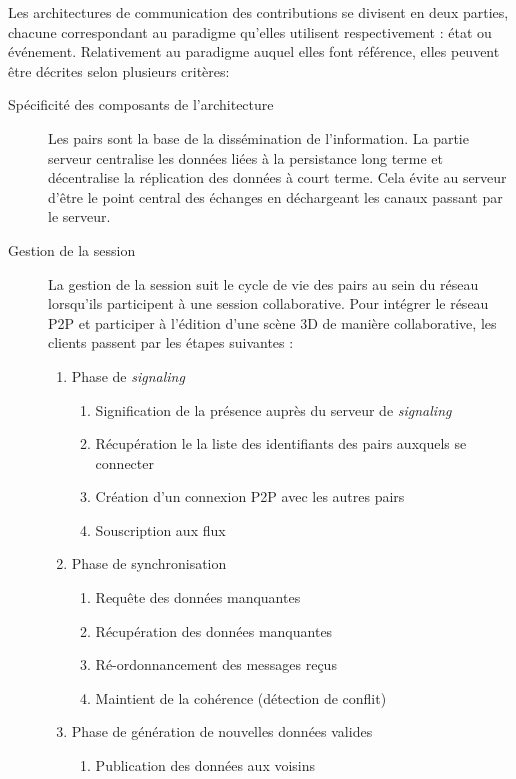 Les architectures de communication des contributions se divisent en deux parties, 
chacune correspondant au paradigme qu'elles utilisent respectivement : état ou 
événement. Relativement au paradigme auquel elles font référence, elles peuvent 
être décrites selon plusieurs critères:
\begin{description}
	\item[Spécificité des composants de l'architecture] Les pairs sont la base de la 
	dissémination de l'information. La partie serveur 
	centralise les données liées à la persistance long  terme et
	décentralise la réplication des données à court terme. Cela évite au 
	serveur 
	d'être le point central des échanges en déchargeant les canaux passant par le 
	serveur.
	\item [Gestion de la session] 
	La gestion de la session suit le cycle de vie des pairs au sein du réseau 
	lorsqu'ils participent à une session collaborative. 
	Pour intégrer le réseau \gls{P2P} et participer à l'édition d'une scène 3D de 
	manière collaborative, les clients passent par les étapes suivantes :
		\begin{enumerate}
		\item Phase de \textit{signaling}
		\label{phase1signaling}
		\begin{enumerate}
			\item Signification de la présence auprès du serveur de \textit{signaling}
			\item Récupération le la liste des identifiants des pairs auxquels se 
			connecter
			\item Création d'un connexion \gls{P2P} avec les autres pairs
			\item Souscription aux flux
			
		\end{enumerate}
		\item Phase de synchronisation
		\label{phase2sync}
		\begin{enumerate}
			\item Requête des données manquantes
			\item Récupération des données manquantes
			\item Ré-ordonnancement des messages reçus
			\item Maintient de la cohérence (détection de conflit)
		\end{enumerate}
		
		\item Phase de génération de nouvelles données valides 
		\label{phase3gen}
		\begin{enumerate}
			\item Publication des données aux voisins
		\end{enumerate}
		

\end{enumerate}
\end{description}
